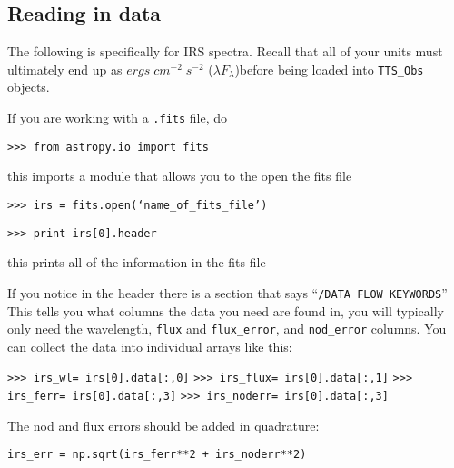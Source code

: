 \documentclass{article}
\begin{document}
\subsection{Reading in data}

\noindent The following is specifically for IRS spectra. Recall that all of your units must ultimately end up as $ergs\;cm^{-2}\;s^{-2}$ 
($\lambda F_{\lambda}$)before being loaded into \texttt{TTS\_Obs} objects.

\noindent If you are working with a \texttt{.fits} file, do

\vspace{2mm}
\texttt{>>> from astropy.io import fits}  
\vspace{2mm}

\noindent this imports a module that allows you to the open the fits file 

\vspace{2mm}
\texttt{>>> irs = fits.open(`name\_of\_fits\_file')}
\vspace{2mm}

\vspace{2mm}	
\texttt{>>> print irs[0].header}  
\vspace{2mm}
	
\noindent this prints all of the information in the fits file
	
\noindent If you notice in the header there is a section that says ``\texttt{/DATA FLOW KEYWORDS}'' This tells  you what columns the data you need are found in, you will typically only need the wavelength,  \texttt{flux} and \texttt{flux\_error}, and \texttt{nod\_error} columns. You can collect the data into individual arrays like this:

\vspace{2mm}
\texttt{>>> irs\_wl= irs[0].data[:,0]}
\texttt{>>> irs\_flux= irs[0].data[:,1]}
\texttt{>>> irs\_ferr= irs[0].data[:,3]}
\texttt{>>> irs\_noderr= irs[0].data[:,3]}

\vspace{2mm}	

\noindent The nod and flux errors should be added in quadrature:

\vspace{2mm}
\texttt{irs\_err = np.sqrt(irs\_ferr**2 + irs\_noderr**2)}
\vspace{2mm}

	   
\end{document}
